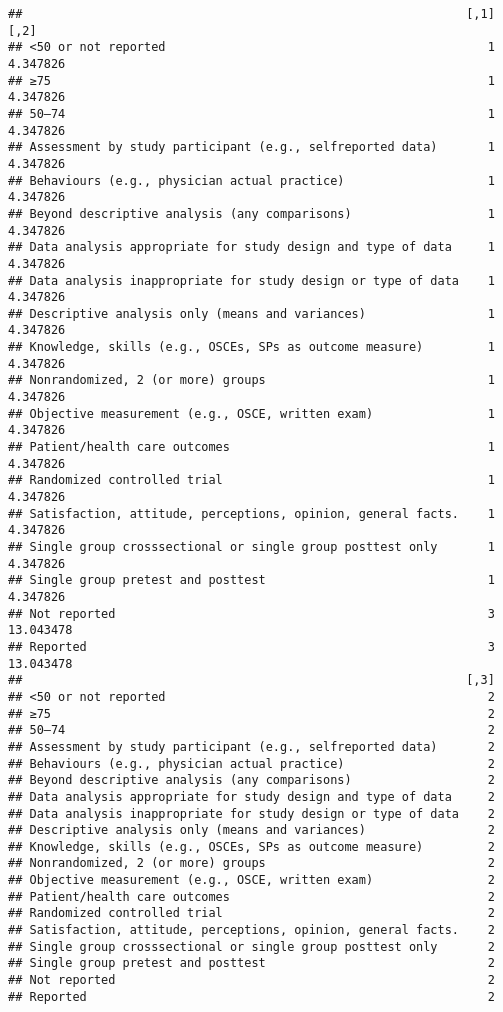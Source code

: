 \documentclass[]{article}
\begin{document}
\begin{verbatim}
##                                                              [,1]      [,2]
## <50 or not reported                                             1  4.347826
## ≥75                                                             1  4.347826
## 50–74                                                           1  4.347826
## Assessment by study participant (e.g., selfreported data)       1  4.347826
## Behaviours (e.g., physician actual practice)                    1  4.347826
## Beyond descriptive analysis (any comparisons)                   1  4.347826
## Data analysis appropriate for study design and type of data     1  4.347826
## Data analysis inappropriate for study design or type of data    1  4.347826
## Descriptive analysis only (means and variances)                 1  4.347826
## Knowledge, skills (e.g., OSCEs, SPs as outcome measure)         1  4.347826
## Nonrandomized, 2 (or more) groups                               1  4.347826
## Objective measurement (e.g., OSCE, written exam)                1  4.347826
## Patient/health care outcomes                                    1  4.347826
## Randomized controlled trial                                     1  4.347826
## Satisfaction, attitude, perceptions, opinion, general facts.    1  4.347826
## Single group crosssectional or single group posttest only       1  4.347826
## Single group pretest and posttest                               1  4.347826
## Not reported                                                    3 13.043478
## Reported                                                        3 13.043478
##                                                              [,3]
## <50 or not reported                                             2
## ≥75                                                             2
## 50–74                                                           2
## Assessment by study participant (e.g., selfreported data)       2
## Behaviours (e.g., physician actual practice)                    2
## Beyond descriptive analysis (any comparisons)                   2
## Data analysis appropriate for study design and type of data     2
## Data analysis inappropriate for study design or type of data    2
## Descriptive analysis only (means and variances)                 2
## Knowledge, skills (e.g., OSCEs, SPs as outcome measure)         2
## Nonrandomized, 2 (or more) groups                               2
## Objective measurement (e.g., OSCE, written exam)                2
## Patient/health care outcomes                                    2
## Randomized controlled trial                                     2
## Satisfaction, attitude, perceptions, opinion, general facts.    2
## Single group crosssectional or single group posttest only       2
## Single group pretest and posttest                               2
## Not reported                                                    2
## Reported                                                        2
\end{verbatim}
\end{document}
